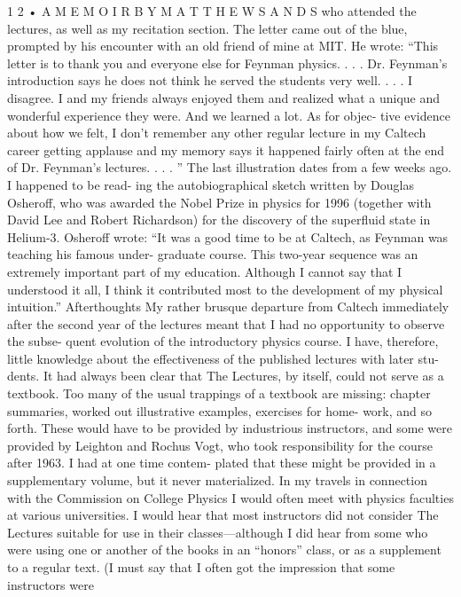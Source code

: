 \documentclass[10pt,oneside]{article}
\begin{document}
1 2 • A  M E M O I R  B Y  M A T T H E W  S A N D S who attended the lectures, as well as my recitation section. The letter came out of the blue, prompted by his encounter with an old friend of mine at MIT. He wrote: “This letter is to thank you and everyone else for Feynman physics. . . . Dr. Feynman’s introduction says he does not think he served the students very well. . . . I disagree. I and my friends always enjoyed them and realized what a unique and wonderful experience they were. And we learned a lot. As for objec- tive evidence about how we felt, I don’t remember any other regular lecture in my Caltech career getting applause and my memory says it happened fairly often at the end of Dr. Feynman’s lectures. . . . ” The last illustration dates from a few weeks ago. I happened to be read- ing the autobiographical sketch written by Douglas Osheroff, who was awarded the Nobel Prize in physics for 1996 (together with David Lee and Robert Richardson) for the discovery of the superfluid state in Helium-3. Osheroff wrote: “It was a good time to be at Caltech, as Feynman was teaching his famous under- graduate course. This two-year sequence was an extremely important part of my education. Although I cannot say that I understood it all, I think it contributed most to the development of my physical intuition.” Afterthoughts My rather brusque departure from Caltech immediately after the second year of the lectures meant that I had no opportunity to observe the subse- quent evolution of the introductory physics course. I have, therefore, little knowledge about the effectiveness of the published lectures with later stu- dents. It had always been clear that The Lectures, by itself, could not serve as a textbook. Too many of the usual trappings of a textbook are missing: chapter summaries, worked out illustrative examples, exercises for home- work, and so forth. These would have to be provided by industrious instructors, and some were provided by Leighton and Rochus Vogt, who took responsibility for the course after 1963. I had at one time contem- plated that these might be provided in a supplementary volume, but it never materialized. In my travels in connection with the Commission on College Physics I would often meet with physics faculties at various universities. I would hear that most instructors did not consider The Lectures suitable for use in their classes---although I did hear from some who were using one or another of the books in an “honors” class, or as a supplement to a regular text. (I must say that I often got the impression that some instructors were\par
\end{document}

